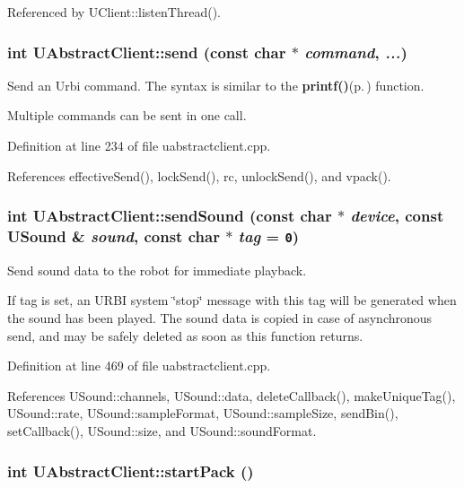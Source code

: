 Referenced by UClient::listen\-Thread().
\subsubsection{\setlength{\rightskip}{0pt plus 5cm}int UAbstract\-Client::send (const char $\ast$ {\em command},  {\em ...})}\label{classUAbstractClient_a4}


Send an Urbi command. The syntax is similar to the {\bf printf()}{\rm (p.\,\pageref{classUAbstractClient_a31})} function. 

Multiple commands can be sent in one call. 

Definition at line 234 of file uabstractclient.cpp.

References effective\-Send(), lock\-Send(), rc, unlock\-Send(), and vpack().
\subsubsection{\setlength{\rightskip}{0pt plus 5cm}int UAbstract\-Client::send\-Sound (const char $\ast$ {\em device}, const {\bf USound} \& {\em sound}, const char $\ast$ {\em tag} = {\tt 0})}\label{classUAbstractClient_a14}


Send sound data to the robot for immediate playback. 

If tag is set, an URBI system \char`\"{}stop\char`\"{} message with this tag will be generated when the sound has been played. The sound data is copied in case of asynchronous send, and may be safely deleted as soon as this function returns. 

Definition at line 469 of file uabstractclient.cpp.

References USound::channels, USound::data, delete\-Callback(), make\-Unique\-Tag(), USound::rate, USound::sample\-Format, USound::sample\-Size, send\-Bin(), set\-Callback(), USound::size, and USound::sound\-Format.
\subsubsection{\setlength{\rightskip}{0pt plus 5cm}int UAbstract\-Client::start\-Pack ()}\label{classUAbstractClient_a7}


